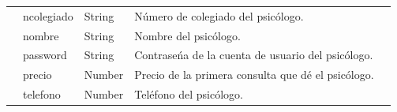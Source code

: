 \begin{table}[htpb]
\begin{tabularx}{\textwidth}{|l|X|X|X|X|}
\\ \cline{2-4} 
                   & ncolegiado                                                                                                                                             & String                                                                                                                     & Número de colegiado del psicólogo.                                                                                                                                                                                                                                          \\ \cline{2-4} 
                   & nombre                                                                                                                                                 & String                                                                                                                     & Nombre del psicólogo.                                                                                                                                                                                                                                                       \\ \cline{2-4} 
                   & password                                                                                                                                               & String                                                                                                                     & Contraseńa de la cuenta de usuario del psicólogo.                                                                                                                                                                                                                          
\\ \cline{2-4} 
                   & precio                                                                                                                                                 & Number                                                                                                                     & Precio de la primera consulta que dé el psicólogo.                                                                                                                                                                                                                          \\ \cline{2-4} 
                   & telefono                                                                                                                                               & Number                                                                                                                     & Teléfono del psicólogo.                                                                                                                                                                                                                                                     \\ \cline{2-4} 

\end{tabularx}
\end{table}
